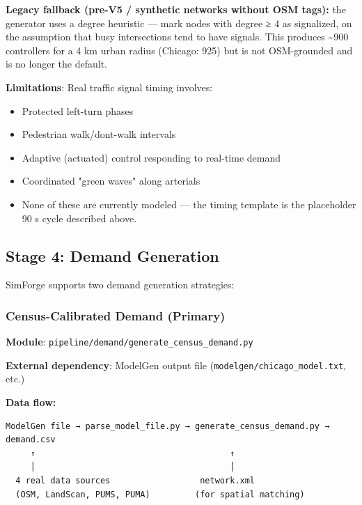\textbf{Legacy fallback (pre-V5 / synthetic networks without OSM tags):}
the generator uses a degree heuristic --- mark nodes with degree ≥ 4 as
signalized, on the assumption that busy intersections tend to have
signals. This produces \textasciitilde900 controllers for a 4 km urban
radius (Chicago: 925) but is not OSM-grounded and is no longer the
default.

\textbf{Limitations}: Real traffic signal timing involves:

\begin{itemize}
\tightlist
\item
  Protected left-turn phases
\item
  Pedestrian walk/don\textquotesingle t-walk intervals
\item
  Adaptive (actuated) control responding to real-time demand
\item
  Coordinated "green waves" along arterials
\item
  None of these are currently modeled --- the timing template is the
  placeholder 90 s cycle described above.
\end{itemize}

\subsection{Stage 4: Demand
Generation}\label{334-stage-4-demand-generation}

SimForge supports two demand generation strategies:

\subsubsection{Census-Calibrated Demand
(Primary)}\label{census-calibrated-demand-primary}

\textbf{Module}: \texttt{pipeline/demand/generate\_census\_demand.py}

\textbf{External dependency}: ModelGen output file
(\texttt{modelgen/chicago\_model.txt}, etc.)

\textbf{Data flow:}

\begin{verbatim}
ModelGen file → parse_model_file.py → generate_census_demand.py → demand.csv
     ↑                                       ↑
     │                                       │
  4 real data sources                  network.xml
  (OSM, LandScan, PUMS, PUMA)         (for spatial matching)
\end{verbatim}


